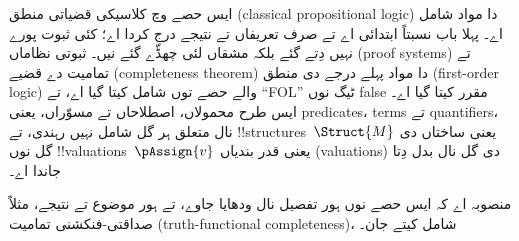 \documentclass[../../include/open-logic-part]{subfiles}
\begin{document}

\begin{editorial}
  ایس حصے وچ کلاسیکی قضیاتی منطق (classical propositional logic) دا
  مواد شامل اے۔ پہلا باب نسبتاً
  ابتدائی اے تے صرف تعریفاں تے نتیجے درج کردا اے؛ کئی ثبوت پورے نہیں
  دِتے گئے بلکہ مشقاں لئی چھڈّے گئے نیں۔ ثبوتی نظاماں (proof systems)
  تے تمامیت دے قضیے (completeness theorem) دا مواد پہلے درجے دی منطق
  (first-order logic) والے حصے توں شامل کیتا گیا اے، تے
  ``FOL'' ٹیگ نوں false مقرر کیتا گیا اے۔ ایس طرح محمولاں، اصطلاحاں
  تے مسوّراں، یعنی predicates، terms تے quantifiers، نال متعلق ہر گل
  شامل نہیں رہندی، تے !!{structure}s~$\Struct{M}$ یعنی ساختاں دی گل
  نوں !!{valuation}s~$\pAssign{v}$ یعنی قدر بندیاں (valuations) دی گل
  نال بدل دِتا جاندا اے۔

  منصوبہ اے کہ ایس حصے نوں ہور تفصیل نال ودھایا جاوے، تے ہور موضوع
  تے نتیجے، مثلاً صداقتی-فنکشنی تمامیت (truth-functional
  completeness)، شامل کیتے جان۔
\end{editorial}










\OLEndPartHook
\end{document}
